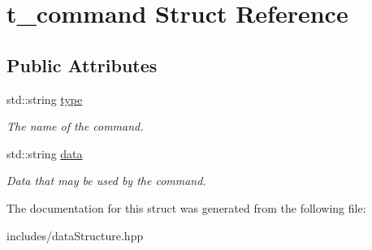 \hypertarget{structt__command}{}\section{t\+\_\+command Struct Reference}
\label{structt__command}
\subsection*{Public Attributes}
\begin{DoxyCompactItemize}
\item 
\mbox{\label{structt__command_a22825d5436cd48ba9547062884349366}} 
std\+::string \hyperlink{structt__command_a22825d5436cd48ba9547062884349366}{type}
\begin{DoxyCompactList}\small\item\em The name of the command. \end{DoxyCompactList}\item 
\mbox{\label{structt__command_aa5824d2c92b5eb4bb733358c2c0bacdc}} 
std\+::string \hyperlink{structt__command_aa5824d2c92b5eb4bb733358c2c0bacdc}{data}
\begin{DoxyCompactList}\small\item\em Data that may be used by the command. \end{DoxyCompactList}\end{DoxyCompactItemize}


The documentation for this struct was generated from the following file\+:\begin{DoxyCompactItemize}
\item 
includes/data\+Structure.\+hpp\end{DoxyCompactItemize}
